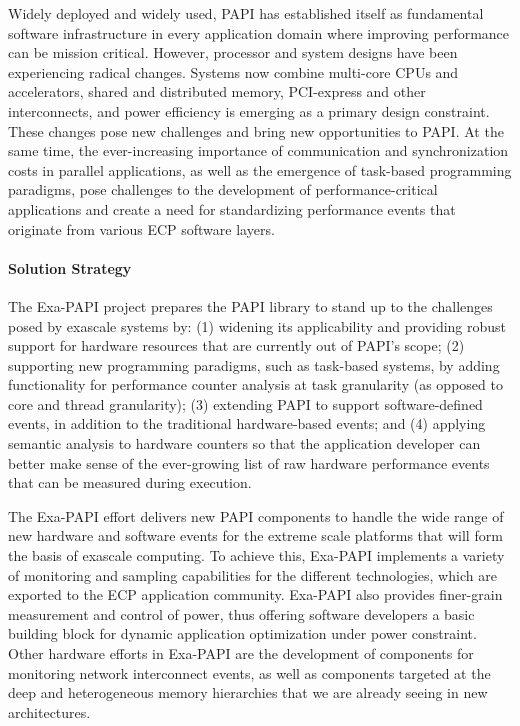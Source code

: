 Widely deployed and widely used, PAPI has established itself as fundamental
software infrastructure in every application domain where improving performance
can be mission critical. 
However, processor and system designs have been experiencing radical changes.
Systems now combine multi-core CPUs and accelerators, shared and
distributed memory, PCI-express and other interconnects, and
power efficiency is emerging as a primary design constraint.
These changes pose new challenges and bring new
opportunities to PAPI. At the same time, the ever-increasing importance of
communication and synchronization costs in parallel applications, as well as the
emergence of task-based programming paradigms, pose
challenges to the development of performance-critical applications and create a
need for standardizing performance events that originate from various ECP
software layers.


\paragraph{Solution Strategy}

The Exa-PAPI project prepares the PAPI library to stand up to the challenges posed 
by exascale systems by:
(1) widening its applicability and providing robust support for hardware resources that 
are currently out of PAPI's scope;
(2) supporting new programming paradigms, such as task-based systems, by adding 
functionality for performance counter analysis at task granularity (as opposed to core 
and thread granularity); 
(3) extending PAPI to support software-defined events, in addition to the traditional 
hardware-based events; and 
(4) applying semantic analysis to hardware counters so that the application developer 
can better make sense of the ever-growing list of raw hardware performance events 
that can be measured during execution.

The Exa-PAPI effort delivers new PAPI components to handle the wide range of
new hardware and software events for the extreme scale platforms that will form
the basis of exascale computing. To achieve this, Exa-PAPI implements a variety
of monitoring and sampling capabilities for the different technologies, which
are exported to the ECP application community. 
%
Exa-PAPI also provides finer-grain measurement and control of power, thus
offering software developers a basic building block for dynamic application
optimization under power constraint. Other hardware efforts in Exa-PAPI are the
development of components for monitoring network interconnect events, as well as
components targeted at the deep and heterogeneous memory hierarchies that we
are already seeing in new architectures.


